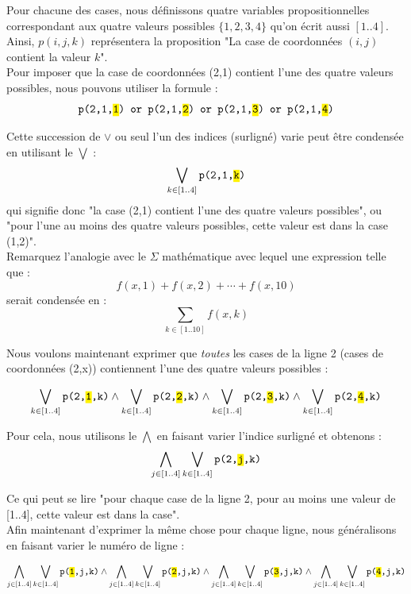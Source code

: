 Pour chacune des cases, nous définissons quatre variables propositionnelles correspondant aux quatre valeurs possibles $\{1,2,3,4\}$ qu'on écrit aussi $[1..4]$. Ainsi, $p(i,j,k)$ représentera la proposition "La case de coordonnées $(i,j)$ contient la valeur $k$".\\

Pour imposer que la case de coordonnées (2,1) contient l'une des quatre valeurs possibles, nous pouvons utiliser la formule : \\
\[\texttt{p(2,1,\hl{1}) or p(2,1,\hl{2}) or p(2,1,\hl{3}) or p(2,1,\hl{4})}\]

Cette succession de $\vee$ ou seul l'un des indices (surligné) varie peut être condensée en utilisant le $\bigvee$ : 
\[\bigvee_{k\in [1..4]} \texttt{p(2,1,\hl{k})} \]
qui signifie donc "la case (2,1) contient l'une des quatre valeurs possibles", ou "pour l'une au moins des quatre valeurs possibles, cette valeur est dans la case (1,2)". \\

\noindent Remarquez l'analogie avec le $\Sigma$ mathématique avec lequel une expression telle que : 
\[f(x,1)+f(x,2)+\cdots+f(x,10)\]
serait condensée en :
\[\sum_{k\in[1..10]} f(x,k)\]


Nous voulons maintenant exprimer que \emph{toutes} les cases de la ligne 2 (cases de coordonnées (2,x)) contiennent l'une des quatre valeurs possibles : 

\[\bigvee_{k\in [1..4]} \texttt{p(2,\hl{1},k)} \wedge \bigvee_{k\in [1..4]} \texttt{p(2,\hl{2},k)}\wedge
\bigvee_{k\in [1..4]} \texttt{p(2,\hl{3},k)} \wedge
\bigvee_{k\in [1..4]} \texttt{p(2,\hl{4},k)}\] 

Pour cela, nous utilisons le $\bigwedge$ en faisant varier l'indice surligné et obtenons : 
\[\bigwedge_{j\in [1..4]}\bigvee_{k\in [1..4]} \texttt{p(2,\hl{j},k)}\]

Ce qui peut se lire "pour chaque case de la ligne 2, pour au moins une valeur de [1..4], cette valeur est dans la case". \\

Afin maintenant d'exprimer la même chose pour chaque ligne, nous généralisons en faisant varier le numéro de ligne : 

\[\bigwedge_{j\in [1..4]}\bigvee_{k\in [1..4]} \texttt{p(\hl{1},j,k)}\wedge \bigwedge_{j\in [1..4]}\bigvee_{k\in [1..4]} \texttt{p(\hl{2},j,k)}\wedge \bigwedge_{j\in [1..4]}\bigvee_{k\in [1..4]} \texttt{p(\hl{3},j,k)}\wedge \bigwedge_{j\in [1..4]}\bigvee_{k\in [1..4]} \texttt{p(\hl{4},j,k)}\]

